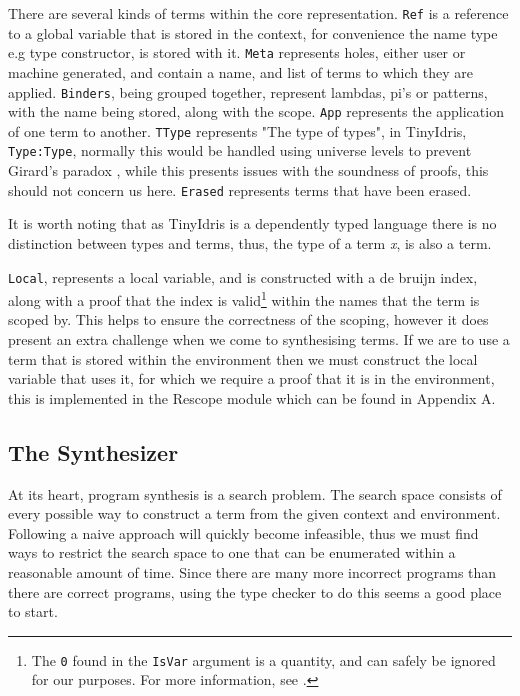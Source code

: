 \documentclass[a4paper]{article}
\begin{document}
There are several kinds of terms within the core representation. 
\texttt{Ref} is a reference to a global variable that is stored in the context, for convenience the name type e.g type constructor, is 
stored with it. \texttt{Meta} represents holes, either user or machine generated, and contain a name, and list of terms to which 
they are applied. \texttt{Binders}, being grouped together, represent lambdas, pi's or patterns, with the name being stored, along with the scope.
\texttt{App} represents the application
of one term to another. \texttt{TType} represents "The type of types", in TinyIdris, \texttt{Type:Type}, normally this would be 
handled using universe levels to prevent Girard's paradox \cite{10.1007/BFb0014058} ,  while this presents issues with the soundness of proofs, this should not concern us here.
\texttt{Erased} represents terms that have been erased. 

It is worth noting that as TinyIdris is a dependently typed language there is no distinction between types and terms, thus, the type of a term \emph{x}, 
is also a term.

\texttt{Local}, represents a local variable, and is constructed with a de bruijn index, along with a proof that the index is 
valid\footnote{The \texttt{0} found in the \texttt{IsVar} argument is a quantity, and can safely be ignored for our purposes. For more information, see \cite{BibEntry2020Nov}.} within the names that the term is scoped by. This helps to ensure the correctness of the scoping, however it 
does present an extra challenge when we come to synthesising terms. If we are to use a term that is stored within the 
environment then we must construct the local variable that uses it, for which we require a proof that it is in the environment,
this is implemented in the Rescope module which can be found in Appendix A. 

\subsection{The Synthesizer}
\label{sec:orgd0606f3}
At its heart, program synthesis is a search problem. The search space consists of every possible way to
construct a term from the given context and environment. Following a naive approach will quickly become infeasible, 
thus we must find ways to restrict the search space to one that can be enumerated within a reasonable amount of time. Since there are 
many more incorrect programs than there are correct programs, using the type checker to do this seems a good place 
to start. 
\end{document}
